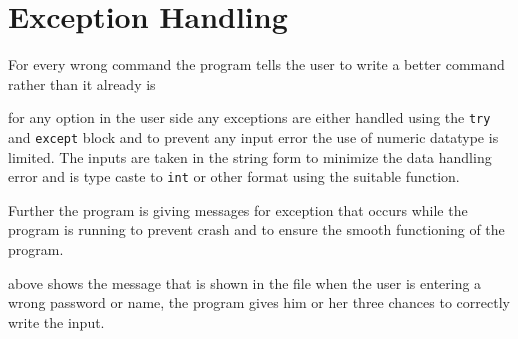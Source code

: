 \documentclass[12pt, a4paper, titlepage, openany]{report}
\begin{document}
\section{Exception Handling}
For every wrong command the program tells the user to write a better command rather than it already is



for any option in the user side any exceptions are either handled using the \verb+try+ and \verb+except+ block and to prevent any input error the use of numeric datatype is limited. The inputs are taken in the string form to minimize the data handling error and is type caste to \verb+int+ or other format using the suitable function.

Further the program is giving messages for exception that occurs while the program is running to prevent crash and to ensure the smooth functioning of the program.

 
above shows the message that is shown in the file when the user is entering a wrong password or name, the program gives him or her three chances to correctly write the input.
\end{document}
